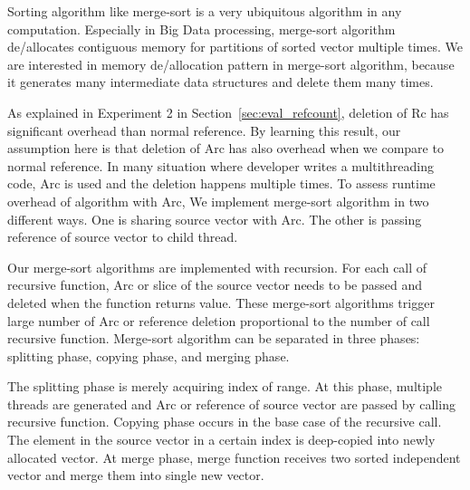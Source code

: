 Sorting algorithm like merge-sort is a very ubiquitous algorithm in any computation. 
Especially in Big Data processing, merge-sort algorithm de/allocates contiguous memory for partitions of sorted vector multiple times.
We are interested in memory de/allocation pattern in merge-sort algorithm, because it generates many intermediate data structures and delete them many times.

As explained in Experiment 2 in Section~\ref{sec:eval_refcount}, deletion of Rc has significant overhead than normal reference. 
By learning this result, our assumption here is that deletion of Arc has also overhead when we compare to normal reference. 
In many situation where developer writes a multithreading code, Arc is used and the deletion happens multiple times. 
To assess runtime overhead of algorithm with Arc, We implement merge-sort algorithm in two different ways. 
One is sharing source vector with Arc. The other is passing reference of source vector to child thread. 

Our merge-sort algorithms are implemented with recursion. For each call of recursive function, 
Arc or slice of the source vector needs to be passed and deleted when the function returns value. 
These merge-sort algorithms trigger large number of Arc or reference deletion proportional to the number of call recursive function.
Merge-sort algorithm can be separated in three phases: splitting phase, copying phase, and merging phase. 

The splitting phase is merely acquiring index of range. At this phase, multiple threads are generated and Arc or reference of source vector are passed by calling recursive function. 
Copying phase occurs in the base case of the recursive call. The element in the source vector in a certain index is deep-copied into newly allocated vector.
At merge phase, merge function receives two sorted independent vector and merge them into single new vector.


